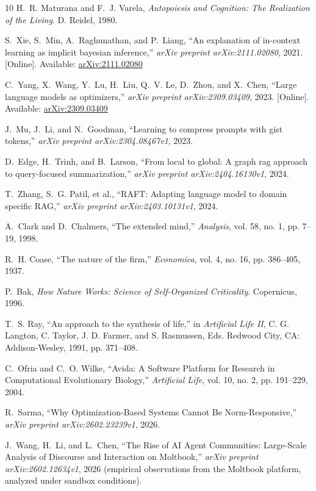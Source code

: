 \documentclass[10pt,journal,compsoc]{IEEEtran}
\begin{document}
\begin{thebibliography}{10}
H.~R. Maturana and F.~J. Varela, {\em Autopoiesis and Cognition: The Realization of the Living}. D. Reidel, 1980.

S.~Xie, S.~Min, A.~Raghunathan, and P.~Liang, ``An explanation of in-context learning as implicit bayesian inference,'' {\em arXiv preprint arXiv:2111.02080}, 2021. [Online]. Available: \href{https://arxiv.org/abs/2111.02080}{arXiv:2111.02080}

C.~Yang, X.~Wang, Y.~Lu, H.~Liu, Q.~V. Le, D.~Zhou, and X.~Chen, ``Large language models as optimizers,'' {\em arXiv preprint arXiv:2309.03409}, 2023. [Online]. Available: \href{https://arxiv.org/abs/2309.03409}{arXiv:2309.03409}

J.~Mu, J.~Li, and N.~Goodman, ``Learning to compress prompts with gist tokens,'' {\em arXiv preprint arXiv:2304.08467v1}, 2023.

D.~Edge, H.~Trinh, and B.~Larson, ``From local to global: A graph rag approach to query-focused summarization,'' {\em arXiv preprint arXiv:2404.16130v1}, 2024.

T.~Zhang, S.~G. Patil, et al., ``RAFT: Adapting language model to domain specific RAG,'' {\em arXiv preprint arXiv:2403.10131v1}, 2024.

A.~Clark and D.~Chalmers, ``The extended mind,'' {\em Analysis}, vol. 58, no. 1, pp. 7--19, 1998.

R.~H. Coase, ``The nature of the firm,'' {\em Economica}, vol. 4, no. 16, pp. 386--405, 1937.

P.~Bak, {\em How Nature Works: Science of Self-Organized Criticality}. Copernicus, 1996.

T.~S. Ray, ``An approach to the synthesis of life,'' in {\em Artificial Life II}, C. G. Langton, C. Taylor, J. D. Farmer, and S. Rasmussen, Eds. Redwood City, CA: Addison-Wesley, 1991, pp. 371--408.

C.~Ofria and C.~O. Wilke, ``Avida: A Software Platform for Research in Computational Evolutionary Biology,'' {\em Artificial Life}, vol. 10, no. 2, pp. 191--229, 2004.

R.~Sarma, ``Why Optimization-Based Systems Cannot Be Norm-Responsive,'' {\em arXiv preprint arXiv:2602.23239v1}, 2026.

J.~Wang, H.~Li, and L.~Chen, ``The Rise of AI Agent Communities: Large-Scale Analysis of Discourse and Interaction on Moltbook,'' {\em arXiv preprint arXiv:2602.12634v1}, 2026 (empirical observations from the Moltbook platform, analyzed under sandbox conditions).


\end{thebibliography}
\end{document}
